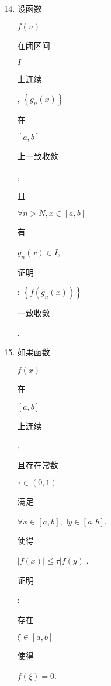 \documentclass[10pt]{article}
\begin{document}
\begin{enumerate}
  \setcounter{enumi}{13}
  \item \begin{CJK}{UTF8}{mj}设函数\end{CJK} $f(u)$ \begin{CJK}{UTF8}{mj}在闭区间\end{CJK} $I$ \begin{CJK}{UTF8}{mj}上连续\end{CJK}, $\left\{g_{n}(x)\right\}$ \begin{CJK}{UTF8}{mj}在\end{CJK} $[a, b]$ \begin{CJK}{UTF8}{mj}上一致收敛\end{CJK}, \begin{CJK}{UTF8}{mj}且\end{CJK} $\forall n>N, x \in[a, b]$ \begin{CJK}{UTF8}{mj}有\end{CJK} $g_{n}(x) \in I$, \begin{CJK}{UTF8}{mj}证明\end{CJK}: $\left\{f\left(g_{n}(x)\right)\right\}$ \begin{CJK}{UTF8}{mj}一致收敛\end{CJK}.

  \item \begin{CJK}{UTF8}{mj}如果函数\end{CJK} $f(x)$ \begin{CJK}{UTF8}{mj}在\end{CJK} $[a, b]$ \begin{CJK}{UTF8}{mj}上连续\end{CJK}, \begin{CJK}{UTF8}{mj}且存在常数\end{CJK} $\tau \in(0,1)$ \begin{CJK}{UTF8}{mj}满足\end{CJK} $\forall x \in[a, b], \exists y \in[a, b]$, \begin{CJK}{UTF8}{mj}使得\end{CJK} $|f(x)| \leqslant \tau|f(y)|$, \begin{CJK}{UTF8}{mj}证明\end{CJK}: \begin{CJK}{UTF8}{mj}存在\end{CJK} $\xi \in[a, b]$ \begin{CJK}{UTF8}{mj}使得\end{CJK} $f(\xi)=0$.

\end{enumerate}
\end{document}

